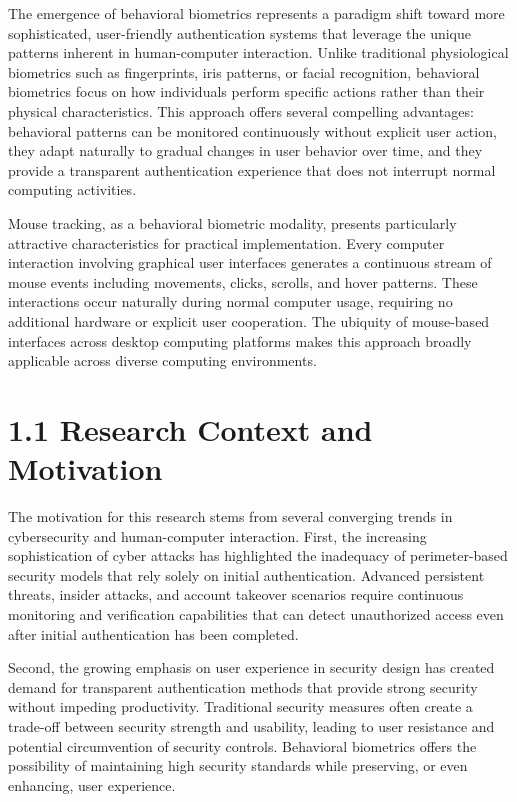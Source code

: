 \documentclass[
  12pt,
  a4paper,
]{report}
\begin{document}
The emergence of behavioral biometrics represents a paradigm shift
toward more sophisticated, user-friendly authentication systems that
leverage the unique patterns inherent in human-computer interaction.
Unlike traditional physiological biometrics such as fingerprints, iris
patterns, or facial recognition, behavioral biometrics focus on how
individuals perform specific actions rather than their physical
characteristics. This approach offers several compelling advantages:
behavioral patterns can be monitored continuously without explicit user
action, they adapt naturally to gradual changes in user behavior over
time, and they provide a transparent authentication experience that does
not interrupt normal computing activities.

Mouse tracking, as a behavioral biometric modality, presents
particularly attractive characteristics for practical implementation.
Every computer interaction involving graphical user interfaces generates
a continuous stream of mouse events including movements, clicks,
scrolls, and hover patterns. These interactions occur naturally during
normal computer usage, requiring no additional hardware or explicit user
cooperation. The ubiquity of mouse-based interfaces across desktop
computing platforms makes this approach broadly applicable across
diverse computing environments.

\section{1.1 Research Context and
Motivation}\label{research-context-and-motivation}

The motivation for this research stems from several converging trends in
cybersecurity and human-computer interaction. First, the increasing
sophistication of cyber attacks has highlighted the inadequacy of
perimeter-based security models that rely solely on initial
authentication. Advanced persistent threats, insider attacks, and
account takeover scenarios require continuous monitoring and
verification capabilities that can detect unauthorized access even after
initial authentication has been completed.

Second, the growing emphasis on user experience in security design has
created demand for transparent authentication methods that provide
strong security without impeding productivity. Traditional security
measures often create a trade-off between security strength and
usability, leading to user resistance and potential circumvention of
security controls. Behavioral biometrics offers the possibility of
maintaining high security standards while preserving, or even enhancing,
user experience.
\end{document}
